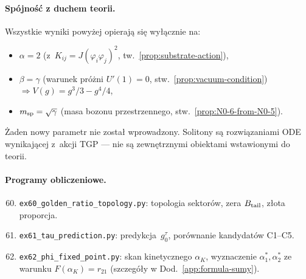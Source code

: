 \paragraph{Spójność z duchem teorii.}
Wszystkie wyniki powyżej opierają się wyłącznie na:
\begin{itemize}[nosep]
  \item[$N0$-2] $\alpha = 2$ (z~$K_{ij} = J(\varphi_i\varphi_j)^2$,
    tw.~\ref{prop:substrate-action}),
  \item[$N0$-5] $\beta = \gamma$ (warunek próżni $U'(1)=0$,
    stw.~\ref{prop:vacuum-condition}) $\Rightarrow V(g) = g^3/3 - g^4/4$,
  \item[$N0$-6] $m_{\rm sp} = \sqrt{\gamma}$ (masa bozonu przestrzennego,
    stw.~\ref{prop:N0-6-from-N0-5}).
\end{itemize}
Żaden nowy parametr nie został wprowadzony.
Solitony są rozwiązaniami ODE wynikającej z~akcji TGP --- nie są
zewnętrznymi obiektami wstawionymi do teorii.

\paragraph{Programy obliczeniowe.}

\begin{enumerate}[nosep,label=\textbf{ex\arabic*.}]
  \setcounter{enumi}{59}
  \item \texttt{ex60\_golden\_ratio\_topology.py}: topologia sektorów,
    zera $B_{\rm tail}$, złota proporcja.
  \item \texttt{ex61\_tau\_prediction.py}: predykcja~$g_0^\tau$,
    porównanie kandydatów C1--C5.
  \item \texttt{ex62\_phi\_fixed\_point.py}: skan kinetycznego $\alpha_K$,
    wyznaczenie $\alpha^*_1, \alpha^*_2$ ze warunku
    $F(\alpha_K) = r_{21}$ (szczegóły w Dod.~\ref{app:formula-sumy}).
\end{enumerate}
